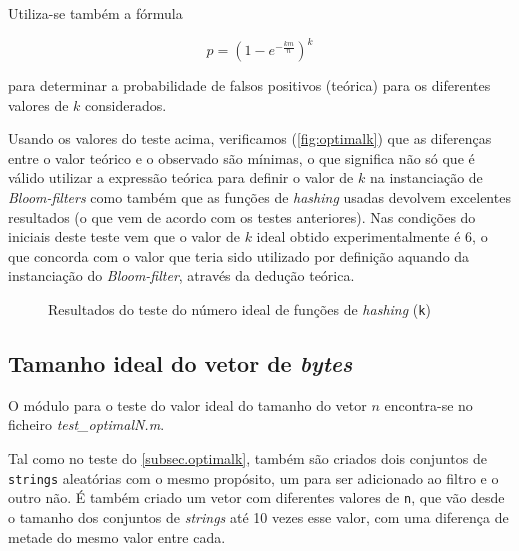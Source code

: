 \documentclass[a4paper,11pt,openright,oneside]{report}
\begin{document}
Utiliza-se também a fórmula

$$ p =  \left(1 - e^{-\frac{km}{n}}\right)^k $$

para determinar a probabilidade de falsos positivos (teórica) para os diferentes valores de $k$ considerados.

Usando os valores do teste acima, verificamos (\autoref{fig:optimalk}) que as diferenças entre o valor teórico e o observado são mínimas, o que significa não só que é válido utilizar a expressão teórica para definir o valor de $k$ na instanciação de \textit{Bloom-filters} como também que as funções de \textit{hashing} usadas devolvem excelentes resultados (o que vem de acordo com os testes anteriores). Nas condições do iniciais deste teste vem que o valor de $k$ ideal obtido experimentalmente é 6, o que concorda com o valor que teria sido utilizado por definição aquando da instanciação do \textit{Bloom-filter}, através da dedução teórica.

\begin{figure}[ht]	
\center
{}
\caption{Resultados do teste do número ideal de funções de \textit{hashing} (\texttt{k})}
\label{fig:optimalk}
\end{figure}

\subsection{Tamanho ideal do vetor de \textit{bytes}}
\label{subsec.optimaln}

O módulo para o teste do valor ideal do tamanho do vetor $n$ encontra-se no ficheiro \textit{test\_optimalN.m}.

Tal como no teste do \autoref{subsec.optimalk}, também são criados dois conjuntos de \texttt{strings} aleatórias com o mesmo propósito, um para ser adicionado ao filtro e o outro não. É também criado um vetor com diferentes valores de \texttt{n}, que vão desde o tamanho dos conjuntos de \textit{strings} até 10 vezes esse valor, com uma diferença de metade do mesmo valor entre cada.
\end{document}
